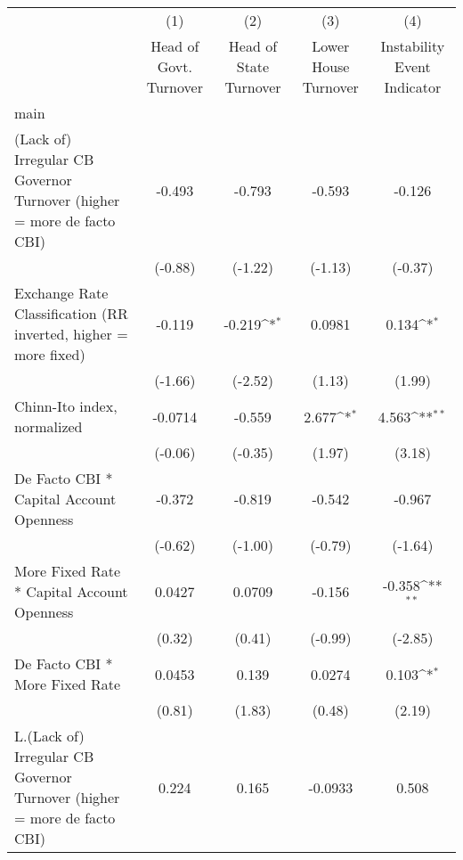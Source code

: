 {
\def\sym#1{\ifmmode^{#1}\else\(^{#1}\)\fi}
\begin{longtable}{l*{4}{c}}
\toprule\endfirsthead\midrule\endhead\midrule\endfoot\endlastfoot
                &\multicolumn{1}{c}{(1)}&\multicolumn{1}{c}{(2)}&\multicolumn{1}{c}{(3)}&\multicolumn{1}{c}{(4)}\\
                &\multicolumn{1}{c}{Head of Govt. Turnover}&\multicolumn{1}{c}{Head of State Turnover}&\multicolumn{1}{c}{Lower House Turnover}&\multicolumn{1}{c}{Instability Event Indicator}\\
\midrule
main            &                  &                  &                  &                  \\
(Lack of) Irregular CB Governor Turnover (higher = more de facto CBI)&   -0.493         &   -0.793         &   -0.593         &   -0.126         \\
                &  (-0.88)         &  (-1.22)         &  (-1.13)         &  (-0.37)         \\
\addlinespace
Exchange Rate Classification (RR inverted, higher = more fixed)&   -0.119         &   -0.219\sym{*}  &   0.0981         &    0.134\sym{*}  \\
                &  (-1.66)         &  (-2.52)         &   (1.13)         &   (1.99)         \\
\addlinespace
Chinn-Ito index, normalized&  -0.0714         &   -0.559         &    2.677\sym{*}  &    4.563\sym{**} \\
                &  (-0.06)         &  (-0.35)         &   (1.97)         &   (3.18)         \\
\addlinespace
De Facto CBI * Capital Account Openness&   -0.372         &   -0.819         &   -0.542         &   -0.967         \\
                &  (-0.62)         &  (-1.00)         &  (-0.79)         &  (-1.64)         \\
\addlinespace
More Fixed Rate * Capital Account Openness&   0.0427         &   0.0709         &   -0.156         &   -0.358\sym{**} \\
                &   (0.32)         &   (0.41)         &  (-0.99)         &  (-2.85)         \\
\addlinespace
De Facto CBI * More Fixed Rate&   0.0453         &    0.139         &   0.0274         &    0.103\sym{*}  \\
                &   (0.81)         &   (1.83)         &   (0.48)         &   (2.19)         \\
\addlinespace
L.(Lack of) Irregular CB Governor Turnover (higher = more de facto CBI)&    0.224         &    0.165         &  -0.0933         &    0.508         \\

\end{longtable}}
